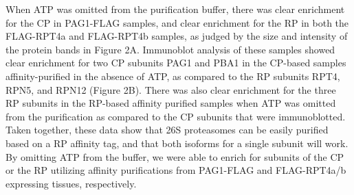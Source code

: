 	When ATP was omitted from the purification buffer, there was clear enrichment for the CP in PAG1-FLAG samples, and clear enrichment for the RP in both the FLAG-RPT4a and FLAG-RPT4b samples, as judged by the size and intensity of the protein bands in Figure 2A. Immunoblot analysis of these samples showed clear enrichment for two CP subunits PAG1 and PBA1 in the CP-based samples affinity-purified in the absence of ATP, as compared to the RP subunits RPT4, RPN5, and RPN12 (Figure 2B). There was also clear enrichment for the three RP subunits in the RP-based affinity purified samples when ATP was omitted from the purification as compared to the CP subunits that were immunoblotted.  Taken together, these data show that 26S proteasomes can be easily purified based on a RP affinity tag, and that both isoforms for a single subunit will work. By omitting ATP from the buffer, we were able to enrich for subunits of the CP or the RP utilizing affinity purifications from PAG1-FLAG and FLAG-RPT4a/b expressing tissues, respectively. 

